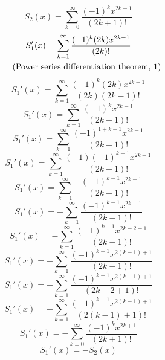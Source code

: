 \documentclass[a4paper,12pt]{report}
\newcommand{\equationnote}[1]{%
    \refstepcounter{equation}%
    \tag{#1, \theequation}%
}
\begin{document}
\begin{equation}
S_2(x) = \sum \limits_{k=0}^{\infty} \frac{(-1)^k x^{2k+1}}{(2k+1)!}
\end{equation}
\begin{gather}
S_1'(x) = \sum \limits_{k=1}^{\infty} \frac{(-1)^k (2k) x^{2k-1}}{(2k)!} \notag \\
\equationnote{Power series differentiation theorem}
\end{gather}
\begin{equation}
S_1'(x) = \sum \limits_{k=1}^{\infty} \frac{(-1)^k (2k) x^{2k-1}}{(2k) (2k-1)!}
\end{equation}
\begin{equation}
S_1'(x) = \sum \limits_{k=1}^{\infty} \frac{(-1)^k x^{2k-1}}{(2k-1)!}
\end{equation}
\begin{equation}
S_1'(x) = \sum \limits_{k=1}^{\infty} \frac{(-1)^{1+k-1} x^{2k-1}}{(2k-1)!}
\end{equation}
\begin{equation}
S_1'(x) = \sum \limits_{k=1}^{\infty} \frac{(-1)(-1)^{k-1} x^{2k-1}}{(2k-1)!}
\end{equation}
\begin{equation}
S_1'(x) = \sum \limits_{k=1}^{\infty} \frac{-(-1)^{k-1} x^{2k-1}}{(2k-1)!}
\end{equation}
\begin{equation}
S_1'(x) = -\sum \limits_{k=1}^{\infty} \frac{(-1)^{k-1} x^{2k-1}}{(2k-1)!}
\end{equation}
\begin{equation}
S_1'(x) = -\sum \limits_{k=1}^{\infty} \frac{(-1)^{k-1} x^{2k-2+1}}{(2k-1)!}
\end{equation}
\begin{equation}
S_1'(x) = -\sum \limits_{k=1}^{\infty} \frac{(-1)^{k-1} x^{2(k-1)+1}}{(2k-1)!}
\end{equation}
\begin{equation}
S_1'(x) = -\sum \limits_{k=1}^{\infty} \frac{(-1)^{k-1} x^{2(k-1)+1}}{(2k-2+1)!}
\end{equation}
\begin{equation}
S_1'(x) = -\sum \limits_{k=1}^{\infty} \frac{(-1)^{k-1} x^{2(k-1)+1}}{(2(k-1)+1)!}
\end{equation}
\begin{equation}
S_1'(x) = -\sum \limits_{k=0}^{\infty} \frac{(-1)^k x^{2k+1}}{(2k+1)!}
\end{equation}
\begin{equation}
S_1'(x) = -S_2(x)
\end{equation}
\end{document}
